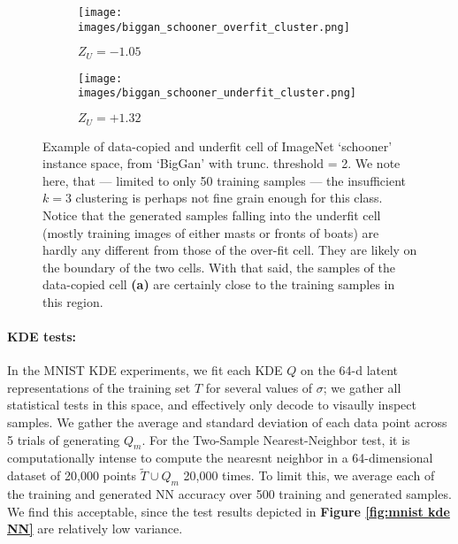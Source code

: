 \begin{figure*}[h]
    \centering
    \begin{subfigure}{0.49\linewidth}
        \centering
        \texttt{[image: images/biggan\_schooner\_overfit\_cluster.png]}
        \label{fig:biggan schooner overfit}
        \caption{$Z_U = -1.05$}
    \end{subfigure}
    \hfill
    \begin{subfigure}{0.49\linewidth}
        \centering
        \texttt{[image: images/biggan\_schooner\_underfit\_cluster.png]}
        \label{fig:biggan schooner underfit}
        \caption{$Z_U = +1.32$}
    \end{subfigure}
    \caption{Example of data-copied and underfit cell of ImageNet `schooner' instance space, from `BigGan' with trunc. threshold = 2. We note here, that --- limited to only 50 training samples --- the insufficient $k = 3$ clustering is perhaps not fine grain enough for this class. Notice that the generated samples falling into the underfit cell (mostly training images of either masts or fronts of boats) are hardly any different from those of the over-fit cell.  They are likely on the boundary of the two cells. With that said, the samples of the data-copied cell \textbf{(a)} are certainly close to the training samples in this region.}
    \label{fig:biggan schooner examples}
\end{figure*}

\paragraph{\textbf{KDE tests}:}
In the MNIST KDE experiments, we fit each KDE $Q$ on the 64-d latent representations of the training set $T$ for several values of $\sigma$; we gather all statistical tests in this space, and effectively only decode to visaully inspect samples. We gather the average and standard deviation of each data point across 5 trials of generating $Q_m$. For the Two-Sample Nearest-Neighbor test, it is computationally intense to compute the nearesnt neighbor in a 64-dimensional dataset of 20,000 points $\widetilde{T} \cup Q_m$ 20,000 times. To limit this, we average each of the training and generated NN accuracy over 500 training and generated samples. We find this acceptable, since the test results depicted in \textbf{Figure \ref{fig:mnist kde NN}} are relatively low variance. 


